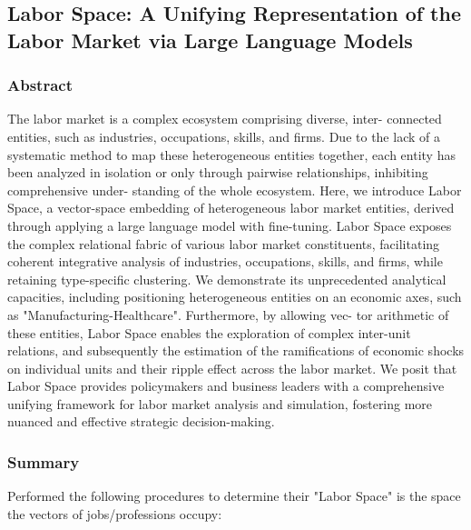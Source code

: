 \documentclass[12pt]{article}
\begin{document}
\subsection*{Labor Space: A Unifying Representation of the Labor Market via Large Language Models}\cite{eloundou2023gpts}

\subsubsection*{Abstract}
The labor market is a complex ecosystem comprising diverse, inter- connected entities, such as industries, occupations, skills, and firms. Due to the lack of a systematic method to map these heterogeneous entities together, each entity has been analyzed in isolation or only through pairwise relationships, inhibiting comprehensive under- standing of the whole ecosystem. Here, we introduce Labor Space, a vector-space embedding of heterogeneous labor market entities, derived through applying a large language model with fine-tuning. Labor Space exposes the complex relational fabric of various labor market constituents, facilitating coherent integrative analysis of industries, occupations, skills, and firms, while retaining type-specific clustering. We demonstrate its unprecedented analytical capacities, including positioning heterogeneous entities on an economic axes, such as "Manufacturing-Healthcare". Furthermore, by allowing vec- tor arithmetic of these entities, Labor Space enables the exploration of complex inter-unit relations, and subsequently the estimation of the ramifications of economic shocks on individual units and their ripple effect across the labor market. We posit that Labor Space provides policymakers and business leaders with a comprehensive unifying framework for labor market analysis and simulation, fostering more nuanced and effective strategic decision-making.


\subsubsection*{Summary}

Performed the following procedures to determine their "Labor Space" is the space the vectors of jobs/professions occupy:
\end{document}
